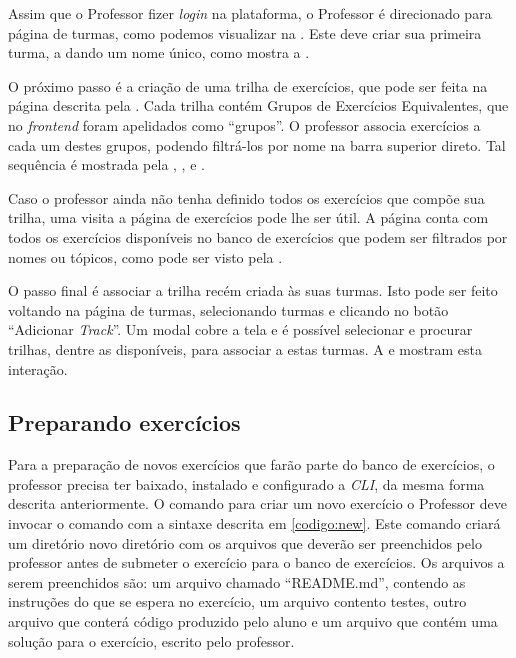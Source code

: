 Assim que o Professor fizer \emph{login} na plataforma, o Professor é direcionado para página de turmas, como podemos visualizar na . 
Este deve criar sua primeira turma, a dando um nome único, como mostra a . 

O próximo passo é a criação de uma trilha de exercícios, que pode ser feita na página descrita pela . Cada trilha
contém Grupos de Exercícios Equivalentes, que no \emph{frontend} foram apelidados como ``grupos''. O professor associa exercícios 
a cada um destes grupos, podendo filtrá-los por nome na barra superior direto. 
Tal sequência é mostrada pela , ,  e .  

Caso o professor ainda não tenha definido todos os exercícios que compõe sua trilha, uma visita a página de exercícios pode lhe 
ser útil. A página conta com todos os exercícios disponíveis no banco de exercícios que podem ser filtrados por nomes ou tópicos, 
como pode ser visto pela .

O passo final é associar a trilha recém criada às suas turmas. Isto pode ser feito voltando na página de turmas, selecionando 
turmas e clicando no botão ``Adicionar \emph{Track}''. Um modal cobre a tela e é possível selecionar e procurar trilhas, dentre 
as disponíveis, para associar a estas turmas. A  e  mostram esta interação.

 





\subsection{Preparando exercícios}
Para a preparação de novos exercícios que farão parte do banco de exercícios, o professor precisa
ter baixado, instalado e configurado a \emph{CLI}, da mesma forma descrita anteriormente. O comando para criar um novo exercício o Professor deve invocar o comando com a sintaxe descrita em \cref{codigo:new}. Este comando criará um diretório novo diretório com os arquivos 
que deverão ser preenchidos pelo professor antes de submeter o exercício para o banco 
de exercícios. Os arquivos a serem preenchidos são: um arquivo chamado ``README.md'', contendo as instruções 
do que se espera no exercício, um arquivo contento testes, outro arquivo que conterá código produzido pelo aluno 
e um arquivo que contém uma solução para o exercício, escrito pelo professor.


